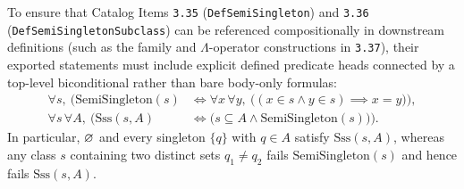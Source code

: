 To ensure that Catalog Items \texttt{3.35} (\texttt{DefSemiSingleton}) and \texttt{3.36} (\texttt{DefSemiSingletonSubclass}) can be referenced compositionally in downstream definitions (such as the family and $\Lambda$-operator constructions in \texttt{3.37}), their exported statements must include explicit defined predicate heads connected by a top-level biconditional rather than bare body-only formulas:
\begin{align}
  \forall s,\ \Big(\mathrm{SemiSingleton}(s) &\iff \forall x\,\forall y,\ \big((x \in s \land y \in s) \implies x = y\big)\Big), \label{eq:def_semisingleton_head} \\
  \forall s\,\forall A,\ \Big(\mathrm{Sss}(s, A) &\iff \big(s \subseteq A \land \mathrm{SemiSingleton}(s)\big)\Big). \label{eq:def_sss_head}
\end{align}
In particular, $\varnothing$ and every singleton $\{q\}$ with $q \in A$ satisfy $\mathrm{Sss}(s, A)$, whereas any class $s$ containing two distinct sets $q_1 \neq q_2$ fails $\mathrm{SemiSingleton}(s)$ and hence fails $\mathrm{Sss}(s, A)$.



